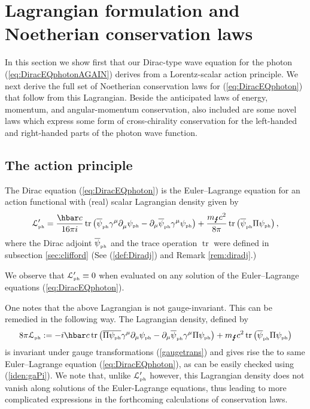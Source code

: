 \documentclass[12pt]{article}
\theoremstyle{definition}
\DeclareMathOperator{\tr}{tr}
\newcommand{\refeq}[1]{(\ref{#1})}
\numberwithin{equation}{section}
\newcommand{\beq}{\begin{equation}}
\newcommand{\eeq}{\end{equation}}
\newcommand{\p}{\partial}
\newcommand{\cLph}{{\mathcal L}_{\mbox{\tiny{ph}}}}
\newcommand{\psiPH}{{\psi_{\mbox{\rm\tiny ph}}}}
\newcommand{\psiPHb}{{\overline\psi_{\mbox{\rm\tiny ph}}}}
\newcommand{\mPH}{{m_{\mbox{\Lightning}}}}
\newcommand{\ga}{\gamma}
\begin{document}
\section{Lagrangian formulation and Noetherian conservation laws}\label{sec:conservation}
 In this section we show first that our Dirac-type wave equation for the photon \refeq{eq:DiracEQphotonAGAIN} 
derives from a Lorentz-scalar action principle.
 We next derive the full set of Noetherian conservation laws for (\ref{eq:DiracEQphoton}) that follow from this Lagrangian.
 Beside the anticipated laws of energy, momentum, and angular-momentum conservation, also included are some novel laws which express
some form of cross-chirality conservation for the left-handed and right-handed parts of the photon wave function. 
 
\subsection{The action principle}\label{sec:action}
The Dirac equation \refeq{eq:DiracEQphoton} is the Euler--Lagrange equation for an action functional with (real) scalar Lagrangian density given by
\beq \label{Lagrangian}
\cLph'=  
 \frac{\hbar c}{16\pi i} \tr\left({\psiPHb} \gamma^\mu_{} \p_\mu^{} \psiPH - \p_\mu \psiPHb \ga^\mu \psiPH\right) 
+ \frac{\mPH c^2}{8 \pi} \tr \left( \psiPHb \Pi \psiPH \right),
\eeq
where the Dirac adjoint $\psiPHb$ and the trace operation $\tr$ were defined in subsection \ref{sec:clifford} 
(See \refeq{def:Diradj} and Remark \ref{rem:diradj}.)

 We  observe that $\cLph' \equiv 0$ when evaluated on any solution of the Euler--Lagrange equations \refeq{eq:DiracEQphoton}. 

 One notes that the above Lagrangian is not gauge-invariant.  
 This can be remedied in the following way.  
 The Lagrangian density, defined by
\beq \label{gaugeinvlag}
8\pi \cLph:= -i \hbar c \tr \left( \overline{\Pi\psiPH} \ga^\mu \p_\mu \psiPH - \p_\mu\psiPHb \ga^\mu \Pi \psiPH \right) 
+ \mPH c^2 \tr \left( \psiPHb \Pi \psiPH \right)
\eeq
is invariant under gauge transformations \refeq{gaugetrans} and gives rise the to same Euler--Lagrange equation \refeq{eq:DiracEQphoton},
as can be easily checked using \refeq{iden:gaPi}. 
 We note that, unlike $\cLph'$ however, this Lagrangian density does not vanish along solutions of the Euler-Lagrange equations,
thus leading to more complicated expressions in the forthcoming calculations of conservation laws.
\end{document}
